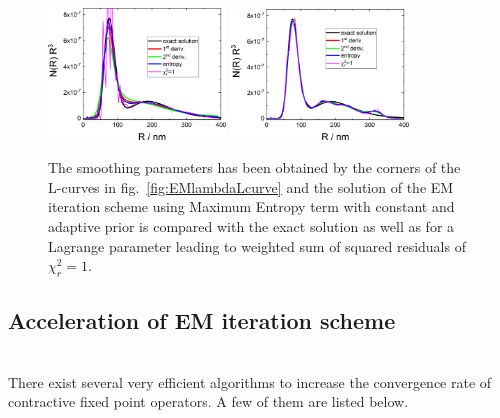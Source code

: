 \begin{figure}[htb]
\centering
\includegraphics[width=0.42\textwidth]{../images/form_factor/EM/EMconstNRR3.png}\hspace{0.06\textwidth}
\includegraphics[width=0.42\textwidth]{../images/form_factor/EM/EMadaptiveNRR3.png}
\caption{The smoothing parameters has been obtained by the corners of the L-curves in fig.\ \ref{fig:EMlambdaLcurve} and the solution of the EM iteration scheme using Maximum Entropy term with constant and adaptive prior is compared with the exact solution as well as for a Lagrange parameter leading to weighted sum of squared residuals of $\chi_r^2=1$.\label{fig:EMconstadaptiveNRR3}}
\end{figure}


\subsection{Acceleration of EM iteration scheme} ~\\

There exist several very efficient algorithms to increase the convergence rate of contractive fixed point operators. A few of them are listed below.

